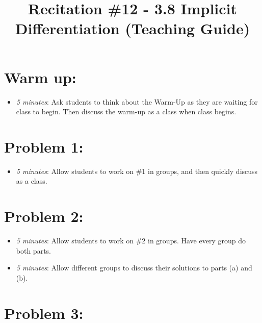 \documentclass[handout,nooutcomes]{ximera}
\title{Recitation \#12 - 3.8 Implicit Differentiation (Teaching Guide)}
\begin{document}
\begin{abstract}		\end{abstract}
\maketitle


\section*{Warm up:} 
	
	\begin{itemize}
	
	\item  \emph{5 minutes}:  Ask students to think about the Warm-Up as they are waiting for class to begin.  Then discuss the warm-up as a class when class begins.
	
	
	
	\end{itemize}


\section*{Problem 1:}

	\begin{itemize}
	
	\item  \emph{5 minutes}:  Allow students to work on \#1 in groups, and then quickly discuss as a class.  
	
	\end{itemize}



\section*{Problem 2:}

	\begin{itemize}
	
	\item  \emph{5 minutes}:  Allow students to work on \#2 in groups.  Have every group do both parts.
		
	\item  \emph{5 minutes}:  Allow different groups to discuss their solutions to parts (a) and (b).  
			
	\end{itemize}
	
	
	
\section*{Problem 3:}
\end{document}
